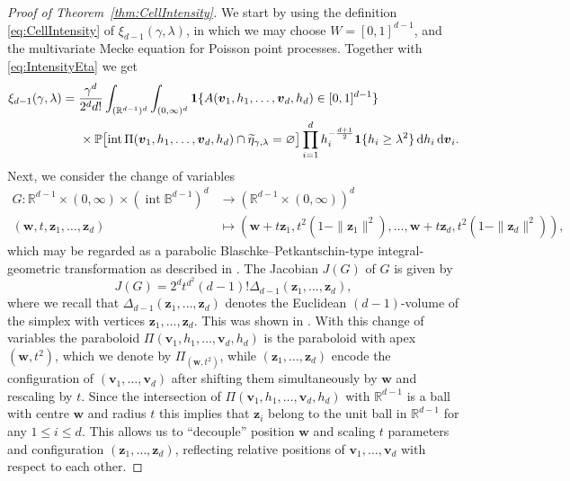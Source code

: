 \documentclass[11pt,a4paper]{article}
\theoremstyle{plain}
\theoremstyle{definition}
\theoremstyle{remark}
\newcommand{\dint}{\textup{d}}
\newcommand{\bz}{\boldsymbol{z}}
\newcommand{\bv}{\boldsymbol{v}}
\newcommand{\bw}{\boldsymbol{w}}
\def\BB{\mathbb{B}}
\def\PP{\mathbb{P}}
\def\RR{\mathbb{R}}
\newcommand{\inter}{\operatorname{int}}
\begin{document}
\begin{proof}[Proof of Theorem~\ref{thm:CellIntensity}]
	We start by using the definition \eqref{eq:CellIntensity} of $\xi_{d-1}(\gamma,\lambda)$, in which we may choose $W=[0,1]^{d-1}$, and the multivariate Mecke equation \cite[Theorem 4.4]{LPbook} for Poisson point processes. Together with \eqref{eq:IntensityEta} we get
	\begin{align*}
		\xi_{d-1}(\gamma,\lambda) & = \frac{\gamma^d}{2^dd!}\int_{(\RR^{d-1})^d}\int_{(0,\infty)^d}{\bf 1}\{A(\bv_1,h_1,\ldots,\bv_d,h_d)\in[0,1]^{d-1}\}                                                                                           \\
		                          & \hspace{0.5cm}\times\PP\big[{\rm int}\,\Pi(\bv_1,h_1,\ldots,\bv_d,h_d)\cap\widetilde\eta_{\gamma,\lambda}=\varnothing\big]\prod_{i=1}^d h_i^{-\frac{d+1}{2}}{\bf 1}\{h_i\geq\lambda^2\}\,\dint h_i\,\dint\bv_i.
	\end{align*}
	Next, we consider the change of variables
	\begin{align*}
		G:\RR^{d-1}\times(0,\infty)\times(\inter\BB^{d-1})^d & \to(\RR^{d-1}\times(0,\infty))^d                                              \\
		(\bw,t,\bz_1,\ldots,\bz_d)                     & \mapsto (\bw+t\bz_1,t^2(1-\|\bz_1\|^2),\ldots,\bw+t\bz_d,t^2(1-\|\bz_d\|^2)),
	\end{align*}
	which may be regarded as a parabolic Blaschke--Petkantschin-type integral-geometric transformation as described in \cite[Chapter 7]{SW}.
	The Jacobian $J(G)$ of $G$ is given by
	\[
		J(G)=2^dt^{d^2}(d-1)!\Delta_{d-1}(\bz_1,\ldots,\bz_d),
	\]
	where we recall that $\Delta_{d-1}(\bz_1,\ldots,\bz_d)$ denotes the Euclidean $(d-1)$-volume of the simplex with vertices $\bz_1,\ldots,\bz_d$. This was shown in \cite[Proof of Theorem 1, page 1272]{GKT22}. With this change of variables the paraboloid $\Pi(\bv_1,h_1,\ldots,\bv_d,h_d)$ is the paraboloid with apex $(\bw,t^2)$, which we denote by $\Pi_{(\bw,t^2)}$, while $(\bz_1,\ldots,\bz_d)$ encode the configuration of $(\bv_1,\ldots,\bv_d)$ after shifting them simultaneously by $\bw$ and rescaling by $t$. Since the intersection of $\Pi(\bv_1,h_1,\ldots,\bv_d,h_d)$ with $\RR^{d-1}$ is a ball with centre $\bw$ and radius $t$ this implies that $\bz_i$ belong to the unit ball in $\RR^{d-1}$ for any $1\leq i\leq d$. This allows us to ``decouple'' position $\bw$ and scaling $t$ parameters and configuration $(\bz_1,\ldots,\bz_d)$, reflecting relative positions of $\bv_1,\ldots,\bv_d$ with respect to each other.





\end{proof}
\end{document}
